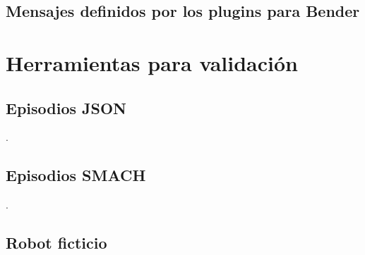 \subsection{Mensajes definidos por los plugins para Bender}

\lstset{style=/Style/ROS/MSG}




\section{Herramientas para validación}

\subsection{Episodios JSON}
.

\subsection{Episodios SMACH}
.

\subsection{Robot ficticio}




